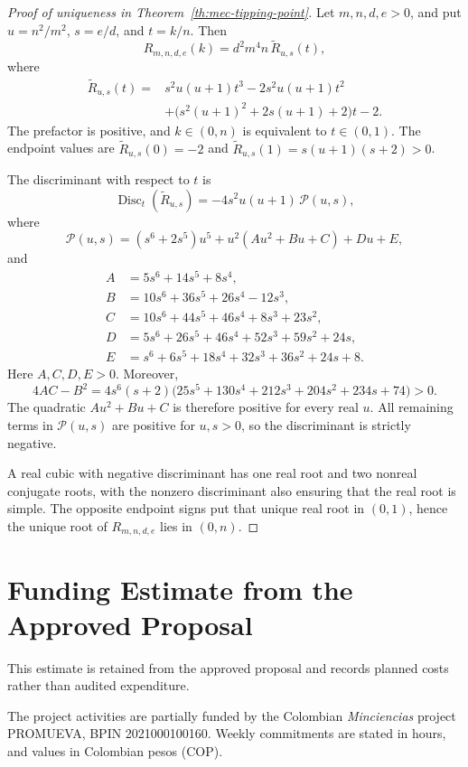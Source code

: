 \documentclass{article}
\theoremstyle{plain}
\theoremstyle{remark}
\begin{document}
\begin{proof}[Proof of uniqueness in Theorem~\ref{th:mec-tipping-point}]
Let $m,n,d,e>0$, and put $u=n^2/m^2$, $s=e/d$, and $t=k/n$. Then
\[
R_{m,n,d,e}(k)=d^2m^4n\,\widetilde R_{u,s}(t),
\]
where
\[
\begin{aligned}
\widetilde R_{u,s}(t)
={}&s^2u(u+1)t^3-2s^2u(u+1)t^2\\
 &+\bigl(s^2(u+1)^2+2s(u+1)+2\bigr)t-2.
\end{aligned}
\]
The prefactor is positive, and $k\in(0,n)$ is equivalent to $t\in(0,1)$. The endpoint values are $\widetilde R_{u,s}(0)=-2$ and $\widetilde R_{u,s}(1)=s(u+1)(s+2)>0$.

The discriminant with respect to $t$ is
\[
\operatorname{Disc}_t(\widetilde R_{u,s})
=-4s^2u(u+1)\,\mathcal{P}(u,s),
\]
where
\[
\mathcal{P}(u,s)
=(s^6+2s^5)u^5+u^2(Au^2+Bu+C)+Du+E,
\]
and
\[
\begin{aligned}
A&=5s^6+14s^5+8s^4,\\
B&=10s^6+36s^5+26s^4-12s^3,\\
C&=10s^6+44s^5+46s^4+8s^3+23s^2,\\
D&=5s^6+26s^5+46s^4+52s^3+59s^2+24s,\\
E&=s^6+6s^5+18s^4+32s^3+36s^2+24s+8.
\end{aligned}
\]
Here $A,C,D,E>0$. Moreover,
\[
4AC-B^2
=4s^6(s+2)
 \bigl(25s^5+130s^4+212s^3+204s^2+234s+74\bigr)>0.
\]
The quadratic $Au^2+Bu+C$ is therefore positive for every real $u$. All remaining terms in $\mathcal{P}(u,s)$ are positive for $u,s>0$, so the discriminant is strictly negative.

A real cubic with negative discriminant has one real root and two nonreal conjugate roots, with the nonzero discriminant also ensuring that the real root is simple. The opposite endpoint signs put that unique real root in $(0,1)$, hence the unique root of $R_{m,n,d,e}$ lies in $(0,n)$.
\end{proof}

\clearpage

\section{Funding Estimate from the Approved Proposal}\label{app:proposal-funding}

This estimate is retained from the approved proposal and records planned costs rather than audited expenditure.

The project activities are partially funded by the Colombian \emph{Minciencias} project PROMUEVA, BPIN 2021000100160. Weekly commitments are stated in hours, and values in Colombian pesos (COP).
\end{document}
